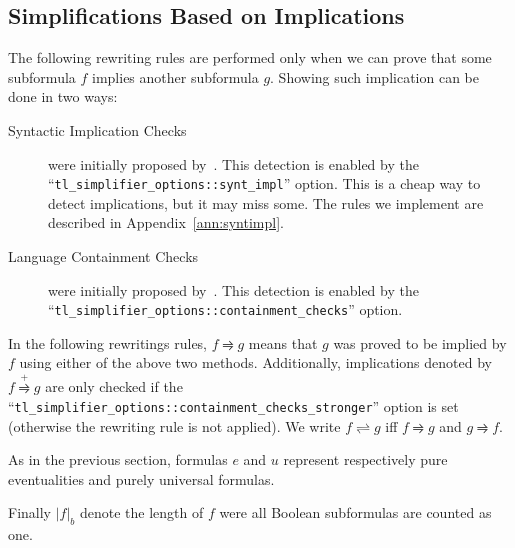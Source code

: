 \documentclass[a4paper,twoside,10pt,DIV=12]{scrreprt}
\newcommand{\0}{\texttt{0}}
\newcommand{\1}{\texttt{1}}
\def\simpe{\rightleftharpoons}
\def\simp{\rightrightharpoons}
\def\Simp{\stackrel{+}{\simp}}
\begin{document}
\subsection{Simplifications Based on Implications}
\label{sec:syntimpl}

The following rewriting rules are performed only when we can prove
that some subformula $f$ implies another subformula $g$.  Showing such
implication can be done in two ways:
\begin{description}
\item[Syntactic Implication Checks] were initially proposed
  by~\citet{somenzi.00.cav}.  This detection is enabled by the
  ``\verb|tl_simplifier_options::synt_impl|'' option.  This is a
  cheap way to detect implications, but it may miss some.  The rules
  we implement are described in Appendix~\ref{ann:syntimpl}.

\item[Language Containment Checks] were initially proposed
  by~\citet{tauriainen.03.tr}.  This detection is enabled by the
  ``\verb|tl_simplifier_options::containment_checks|'' option.
\end{description}

In the following rewritings rules, $f\simp g$ means that $g$ was
proved to be implied by $f$ using either of the above two methods.
Additionally, implications denoted by $f\Simp g$ are only checked if
the ``\verb|tl_simplifier_options::containment_checks_stronger|''
option is set (otherwise the rewriting rule is not applied).  We write
$f\simpe g$ iff $f\simp g$ and $g\simp f$.

As in the previous section, formulas $e$ and $u$ represent
respectively pure eventualities and purely universal formulas.

Finally $|f|_b$ denote the length of $f$ were all Boolean subformulas
are counted as one.

\def\flessg{(f\simpe g) \land (|f|_b<|g|_b)}
\def\glessf{(f\simpe g) \land (|g|_b<|f|_b)}
\end{document}
